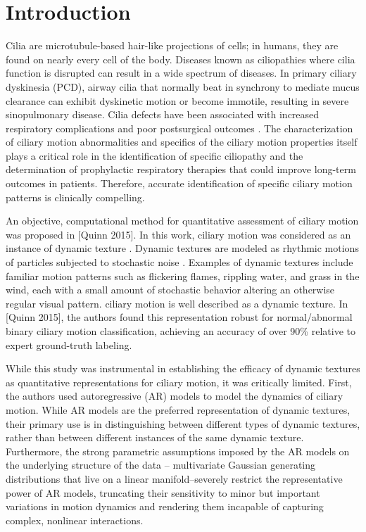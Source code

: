 \section{Introduction}
Cilia are microtubule-based hair-like projections of cells; in humans, they are found on nearly every cell of the body. Diseases known as ciliopathies where cilia function is disrupted can result in a wide spectrum of diseases. In primary ciliary dyskinesia (PCD), airway cilia that normally beat in synchrony to mediate mucus clearance can exhibit dyskinetic motion or become immotile, resulting in severe sinopulmonary disease\cite{o2007diagnosing}. Cilia defects have been associated with increased respiratory complications and poor postsurgical outcomes \cite{nakhleh2012high}. The characterization of ciliary motion abnormalities and specifics of the ciliary motion properties itself plays a critical role in the identification of specific ciliopathy and the determination of prophylactic respiratory therapies that could improve long-term outcomes in patients. Therefore, accurate identification of specific ciliary motion patterns is clinically compelling.

An objective, computational method for quantitative assessment of ciliary motion was proposed in [Quinn 2015]. In this work, ciliary motion was considered as an instance of dynamic texture \cite{saisan2001dynamic}. Dynamic textures are modeled as rhythmic motions of particles subjected to stochastic noise \cite{chen2013automatic}. Examples of dynamic textures include familiar motion patterns such as flickering flames, rippling water, and grass in the wind, each with a small amount of stochastic behavior altering an otherwise regular visual pattern. ciliary motion is well described as a dynamic texture. In [Quinn 2015], the authors found this representation robust for normal/abnormal binary ciliary motion classification, achieving an accuracy of over 90\% relative to expert ground-truth labeling.

While this study was instrumental in establishing the efficacy of dynamic textures as quantitative representations for ciliary motion, it was critically limited. First, the authors used autoregressive (AR) models \cite{hyndman2007higher} to model the dynamics of ciliary motion. While AR models are the preferred representation of dynamic textures, their primary use is in distinguishing between different types of dynamic textures, rather than between different instances of the same dynamic texture. Furthermore, the strong parametric assumptions imposed by the AR models on the underlying structure of the data -- multivariate Gaussian generating distributions that live on a linear manifold--severely restrict the representative power of AR models, truncating their sensitivity to minor but important variations in motion dynamics and rendering them incapable of capturing complex, nonlinear interactions.

